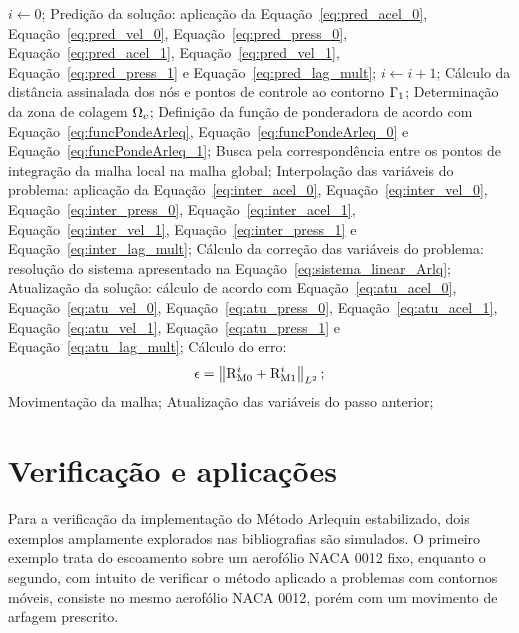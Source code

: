 \begin{algorithm}
	\caption{Algoritmo para problemas móveis da DFC utilizando técnica RBSAM}
	\label{alg:fluidARLQ}
	\begin{algorithmic}[1]
		\State $i\gets 0$;
		\State Predição da solução: aplicação da Equação~\eqref{eq:pred_acel_0}, Equação~\eqref{eq:pred_vel_0}, Equação~\eqref{eq:pred_press_0},
		Equação~\eqref{eq:pred_acel_1}, Equação~\eqref{eq:pred_vel_1}, Equação~\eqref{eq:pred_press_1} e Equação~\eqref{eq:pred_lag_mult};
		\State $i \gets i+1$;
		\State Cálculo da distância assinalada dos nós e pontos de controle ao contorno $\Gamma_1$;
		\State Determinação da zona de colagem $\Omega_c$;
		\State Definição da função de ponderadora de acordo com Equação~\eqref{eq:funcPondeArleq}, Equação~\eqref{eq:funcPondeArleq_0} e Equação~\eqref{eq:funcPondeArleq_1};
		\State Busca pela correspondência entre os pontos de integração da malha local na malha global;
		\State Interpolação das variáveis do problema: aplicação da Equação~\eqref{eq:inter_acel_0}, Equação~\eqref{eq:inter_vel_0}, Equação~\eqref{eq:inter_press_0},
		Equação~\eqref{eq:inter_acel_1}, Equação~\eqref{eq:inter_vel_1}, Equação~\eqref{eq:inter_press_1} e Equação~\eqref{eq:inter_lag_mult}; 
		\State Cálculo da correção das variáveis do problema: resolução do sistema apresentado na Equação~\eqref{eq:sistema_linear_Arlq};
		\State Atualização da solução: cálculo de acordo com Equação~\eqref{eq:atu_acel_0}, Equação~\eqref{eq:atu_vel_0}, Equação~\eqref{eq:atu_press_0},
		Equação~\eqref{eq:atu_acel_1}, Equação~\eqref{eq:atu_vel_1}, Equação~\eqref{eq:atu_press_1} e Equação~\eqref{eq:atu_lag_mult};
		\State Cálculo do erro:
		\begin{align}
			\epsilon =\left\| \mathrm{R}_\mathrm{M0}^{i} + \mathrm{R}_\mathrm{M1}^{i}  \right\|_{L^2};
		\end{align}
		\State Movimentação da malha;
		\EndWhile
		\State Atualização das variáveis do passo anterior;
		\EndFor
	\end{algorithmic}
\end{algorithm}

\section{Verificação e aplicações}\label{capitulo:Cap6:Exemplos}

Para a verificação da implementação do Método Arlequin estabilizado, dois exemplos amplamente explorados nas bibliografias são simulados. O primeiro exemplo trata do escoamento sobre um aerofólio NACA 0012 fixo, enquanto o segundo, com intuito de verificar o método aplicado a problemas com contornos móveis, consiste no mesmo aerofólio NACA 0012, porém com um movimento de arfagem prescrito. 

